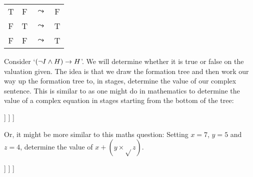 {\begin{enumerate}
\begin{center}
\begin{tabular}{cccc}
				T & F &$\leadsto$& F\\
				F & T &$\leadsto$& T\\
				F & F &$\leadsto$& T
			\end{tabular}
		\end{center}
	\end{enumerate}
}

Consider 
`$(\neg I\mathbin{\wedge} H)\rightarrow H$'. We will determine whether it is true or false on the valuation given. 
The idea is that we draw the formation tree and then work our way up the formation tree to, in stages, determine the value of our complex sentence.
This is similar to as one might do in mathematics to determine the value of a complex equation in stages starting from the bottom of the tree:
\begin{center}
	\begin{forest}
		[{$7\mainconnective{+}(5\times\sqrt{}4)$}, label=right:{\scriptsize $=17$}
		[{$7$}]
		[{$(5\mainconnective{\times} \sqrt{}4)$}, label=right:{\scriptsize $=10$}
		[{$5$}]
		[{$\mainconnective{\sqrt{}}{4}$}, label=right:{\scriptsize $=2$}
		[{$4$}]
		]
		]
		]
	\end{forest}
\end{center}

Or, it might be more similar to this maths question: Setting $x=7$, $y=5$ and $z=4$,  determine the value of $x+(y\times\sqrt{}z)$. 
\begin{center}
	\begin{forest}
		[{$x+(y\times\sqrt{}z)$}, label=right:{\scriptsize $=17$}
		[$x$, label=left:{\scriptsize $7=$}]
		[{$y\times\sqrt{}z$}, label=right:{\scriptsize $=10$}
		[$y$, label=left:{\scriptsize $5=$}]
		[{$\sqrt{}z$}, label=right:{\scriptsize $=2$}
		[$z$, label=right:{\scriptsize $=4$}]
		]
		]
		]
	\end{forest}
\end{center}


